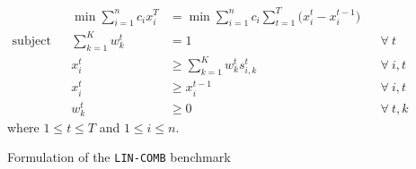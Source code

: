 \documentclass[a4paper]{article}
\begin{document}
\begin{figure}
\begin{mdframed}
    \begin{align*}
		&& \min \sum_{i=1}^{n} c_{i} x_{i}^{T} &= \min \sum_{i=1}^{n} c_{i} \sum_{t=1}^{T}\bigl( x_{i}^{t} - x_{i}^{t-1}\bigr)\\
    \text{subject to} &&
		\sum_{k=1}^{K} w_{k}^{t} &= 1  && \forall\ t \\
		&& x_{i}^{t} &\geq \sum_{k=1}^{K} w_{k}^{t} s_{i,k}^{t} && \forall\ i, t\\
		&& x_{i}^{t} &\geq x_{i}^{t-1} && \forall\ i, t\\
		&& w_{k}^{t} &\geq 0  && \forall\ t, k
    \end{align*}
    where $1 \leq t \leq T$ and $1 \leq i \leq n$.
    \vspace{5pt}
\end{mdframed}
\caption{Formulation of the \texttt{LIN-COMB} benchmark}
\label{fig:benchmark}
\end{figure}

\clearpage
\end{document}
